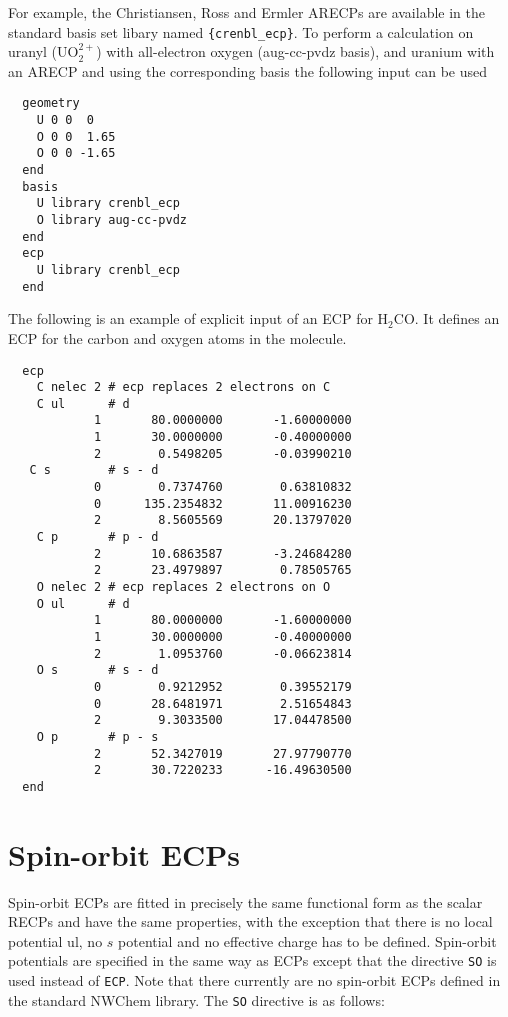 For example, the Christiansen, Ross and Ermler ARECPs are available in
the standard basis set libary named \verb+{crenbl_ecp}+.  To perform a
calculation on uranyl (UO$_2^{2+}$) with all-electron oxygen
(aug-cc-pvdz basis), and uranium with an ARECP and using the
corresponding basis the following input can be used
\begin{verbatim}
  geometry
    U 0 0  0
    O 0 0  1.65
    O 0 0 -1.65
  end
  basis 
    U library crenbl_ecp
    O library aug-cc-pvdz
  end
  ecp
    U library crenbl_ecp
  end
\end{verbatim}

The following is an example of explicit input of an ECP for H$_2$CO.
It defines an ECP for the carbon and oxygen atoms in the molecule.


\begin{verbatim}
  ecp
    C nelec 2 # ecp replaces 2 electrons on C
    C ul      # d
            1       80.0000000       -1.60000000
            1       30.0000000       -0.40000000
            2        0.5498205       -0.03990210
   C s        # s - d 
            0        0.7374760        0.63810832
            0      135.2354832       11.00916230
            2        8.5605569       20.13797020
    C p       # p - d
            2       10.6863587       -3.24684280
            2       23.4979897        0.78505765
    O nelec 2 # ecp replaces 2 electrons on O
    O ul      # d 
            1       80.0000000       -1.60000000
            1       30.0000000       -0.40000000
            2        1.0953760       -0.06623814
    O s       # s - d
            0        0.9212952        0.39552179
            0       28.6481971        2.51654843
            2        9.3033500       17.04478500
    O p       # p - s 
            2       52.3427019       27.97790770
            2       30.7220233      -16.49630500
  end
\end{verbatim}

\section{Spin-orbit ECPs}
\label{sec:spinorb_ecp}

Spin-orbit ECPs are fitted in precisely the same functional form as the
scalar RECPs and have the same properties, with the exception that there is
no local potential ul, no $s$ potential and no effective charge has to be
defined. Spin-orbit potentials are
specified in the same way as ECPs except that the directive \verb+SO+ is
used instead of \verb+ECP+. Note that there currently are no spin-orbit
ECPs defined in the standard NWChem library.  The \verb+SO+ 
directive is as follows:

